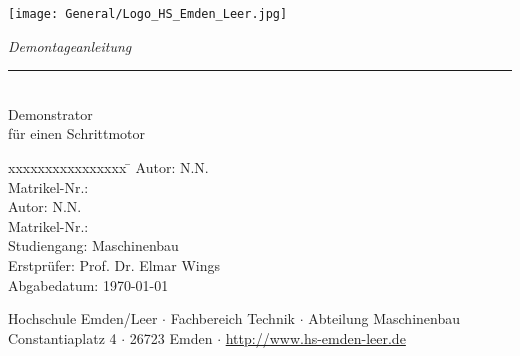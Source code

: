 %
%

\begin{titlepage}
    
    \begin{flushleft} 
        \texttt{[image: General/Logo\_HS\_Emden\_Leer.jpg]}
    \end{flushleft} 
    
    \begin{flushright}
        \vspace{2cm}
        \LARGE \textsl{Demontageanleitung}\\
        \rule{0.6\textwidth}{0.4pt} ~\\
        \vspace{0.5cm}
        \textsf{\LARGE Demonstrator}\\
        \textsf{\LARGE für einen Schrittmotor}
    \end{flushright}
    
    \vspace{3cm}
    \large
    \begin{tabbing}
       xxxxxxxxxxxxxxxx \= \kill
       Autor:			\> N.N. \\
       Matrikel-Nr.:	 \\
       Autor:			\> N.N. \\
       Matrikel-Nr.:	 \\



       Studiengang: \> Maschinenbau \\ [0.5cm]
       Erstprüfer: \> Prof. Dr. Elmar Wings \\
        Abgabedatum: \> \today \\
    \end{tabbing}
    
    \vspace{3cm}
    \small
    \begin{center}
        Hochschule Emden/Leer $\cdot$ 
        Fachbereich Technik $\cdot$ 
        Abteilung Maschinenbau \\
        Constantiaplatz 4 $\cdot$ 
        26723 Emden $\cdot$ 
        \url{http://www.hs-emden-leer.de}
    \end{center}
    
\end{titlepage}
